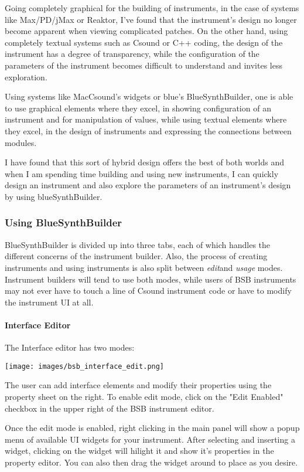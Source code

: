 Going completely graphical for the building of instruments, in the case
of systems like Max/PD/jMax or Reaktor, I've found that the instrument's
design no longer become apparent when viewing complicated patches. On
the other hand, using completely textual systems such as Csound or C++
coding, the design of the instrument has a degree of transparency, while
the configuration of the parameters of the instrument becomes difficult
to understand and invites less exploration.

Using systems like MacCsound's widgets or blue's BlueSynthBuilder, one
is able to use graphical elements where they excel, in showing
configuration of an instrument and for manipulation of values, while
using textual elements where they excel, in the design of instruments
and expressing the connections between modules.

I have found that this sort of hybrid design offers the best of both
worlds and when I am spending time building and using new instruments, I
can quickly design an instrument and also explore the parameters of an
instrument's design by using blueSynthBuilder.

\subsubsection{Using BlueSynthBuilder}

BlueSynthBuilder is divided up into three tabs, each of which handles
the different concerns of the instrument builder. Also, the process of
creating instruments and using instruments is also split between
\emph{edit}and \emph{usage} modes. Instrument builders will tend to use
both modes, while users of BSB instruments may not ever have to touch a
line of Csound instrument code or have to modify the instrument UI at
all.

\paragraph{Interface Editor}

The Interface editor has two modes:

\texttt{[image: images/bsb\_interface\_edit.png]}

The user can add interface elements and modify their properties using
the property sheet on the right. To enable edit mode, click on the "Edit
Enabled" checkbox in the upper right of the BSB instrument editor.

Once the edit mode is enabled, right clicking in the main panel will
show a popup menu of available UI widgets for your instrument. After
selecting and inserting a widget, clicking on the widget will hilight it
and show it's properties in the property editor. You can also then drag
the widget around to place as you desire.


